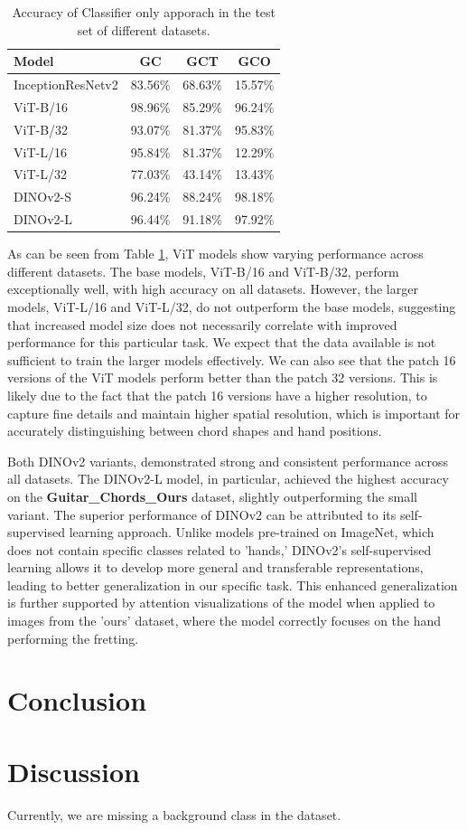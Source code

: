 \documentclass[10pt,twocolumn,letterpaper]{article}
\begin{document}
\begin{table}[h]
  \centering
  \begin{tabular}{lccc}
    \toprule
    \textbf{Model} & \textbf{GC} & \textbf{GCT} & \textbf{GCO} \\
    \midrule
    InceptionResNetv2 & 83.56\% & 68.63\% & 15.57\% \\
    \midrule
    ViT-B/16 & 98.96\% & 85.29\% & 96.24\% \\
    ViT-B/32 & 93.07\% & 81.37\% & 95.83\% \\
    ViT-L/16 & 95.84\% & 81.37\% & 12.29\% \\
    ViT-L/32 & 77.03\% & 43.14\% & 13.43\% \\
    DINOv2-S & 96.24\% & 88.24\% & 98.18\% \\
    DINOv2-L & 96.44\% & 91.18\% & 97.92\% \\
    \bottomrule
  \end{tabular}
  \caption{Accuracy of Classifier only apporach in the test set of different datasets.}
  \label{tab:transformer-models-results}
\end{table}

As can be seen from Table \ref{tab:transformer-models-results}, ViT models show varying performance across different datasets. The base models, ViT-B/16 and ViT-B/32, perform exceptionally well, with high accuracy on all datasets. However, the larger models, ViT-L/16 and ViT-L/32, do not outperform the base models, suggesting that increased model size does not necessarily correlate with improved performance for this particular task. We expect that the data available is not sufficient to train the larger models effectively. We can also see that the patch 16 versions of the ViT models perform better than the patch 32 versions. This is likely due to the fact that the patch 16 versions have a higher resolution, to capture fine details and maintain higher spatial resolution, which is important for accurately distinguishing between chord shapes and hand positions.

Both DINOv2 variants, demonstrated strong and consistent performance across all datasets. The DINOv2-L model, in particular, achieved the highest accuracy on the \textbf{Guitar\_Chords\_Ours} dataset, slightly outperforming the small variant. The superior performance of DINOv2 can be attributed to its self-supervised learning approach. Unlike models pre-trained on ImageNet, which does not contain specific classes related to 'hands,' DINOv2's self-supervised learning allows it to develop more general and transferable representations, leading to better generalization in our specific task. This enhanced generalization is further supported by attention visualizations of the model when applied to images from the 'ours' dataset, where the model correctly focuses on the hand performing the fretting.

\section{Conclusion}

\section{Discussion}
Currently, we are missing a background class in the dataset.


 {\small
  
  
 }
\end{document}
